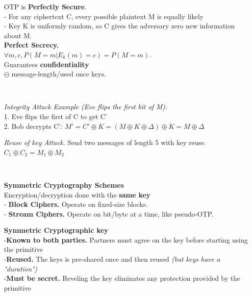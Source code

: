 \documentclass[main.tex]{subfiles}
\begin{document}
\begin{minipage}[t]{0.495\textwidth}
\begin{minipage}[t]{0.45\textwidth}
	\end{minipage}
	\begin{minipage}[t]{0.55\textwidth}
		OTP is \textbf{Perfectly Secure}.\\
		- For any ciphertext C, every possible plaintext M is equally likely\\
		- Key K is uniformly random, so C gives the adversary zero new information about M.\\
		\textbf{Perfect Secrecy.}\\$\forall m, c, P(M = m | E_{k}(m)=c) = P(M = m)$.\\
			Guarantees \textbf{confidentiality} \\ $\ominus$ message-length/used once keys.
	\end{minipage}\\
	\begin{minipage}[t]{0.6\textwidth}
		\textit{Integrity Attack Example (Eve flips the first bit of M)}:\\
		1. Eve flips the first of C to get C'\\
		2. Bob decrypts C': $M' = C' \oplus K = (M \oplus K \oplus \Delta) \oplus K  = M \oplus \Delta$
	\end{minipage}
	\begin{minipage}[t]{0.4\textwidth}
		\textit{Reuse of key Attack.}
		Send two messages of length 5 with key reuse.\\
		$C_1 \oplus C_2 = M_1 \oplus M_2$
	\end{minipage}\\
	\begin{minipage}[t]{0.39\textwidth}
		\textbf{Symmetric Cryptography Schemes}\\Encryption/decryption done with the \textbf{same key}\\
		- \textbf{Block Ciphers.} Operate on fixed-size blocks.\\
		- \textbf{Stream Ciphers.} Operate on bit/byte at a time, like pseudo-OTP.
	\end{minipage}\hfill
	\begin{minipage}[t]{0.59\textwidth}
		\textbf{Symmetric Cryptographic key}\\
		-\textbf{Known to both parties.} Partners must agree on the key before starting using the primitive\\
		-\textbf{Reused.} The keys is pre-shared once and then reused \textit{(but keys have a "duration")}\\
		-\textbf{Must be secret.} Reveling the key eliminates any protection provided by the primitive

\end{minipage}
\end{minipage}
\end{document}
